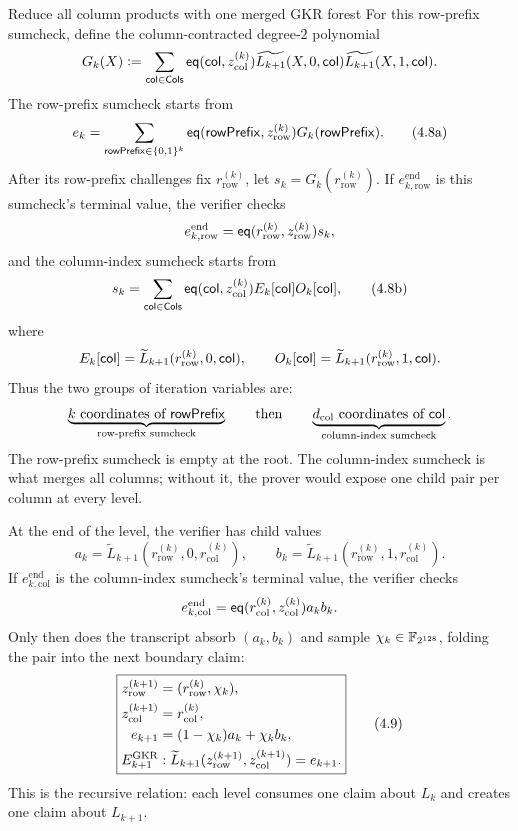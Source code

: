 \begin{step}{Reduce all column products with one merged GKR forest}{%
}
For this row-prefix sumcheck, define the
column-contracted degree-$2$ polynomial
\[
  G_k(X)
  \vcentcolon=
  \sum_{\mathsf{col}\in\mathsf{Cols}}
    \mathsf{eq}(\mathsf{col},z_{\mathrm{col}}^{(k)})
    \widetilde{L_{k+1}}(X,0,\mathsf{col})
    \widetilde{L_{k+1}}(X,1,\mathsf{col}).
\]
The row-prefix sumcheck starts from
\[
  e_k=\sum_{\mathsf{rowPrefix}\in\{0,1\}^k}
       \mathsf{eq}(\mathsf{rowPrefix},z_{\mathrm{row}}^{(k)})G_k(\mathsf{rowPrefix}).
                                                        \tag{4.8a}
\]
After its row-prefix challenges fix
$r_{\mathrm{row}}^{(k)}$, let
$s_k=G_k(r_{\mathrm{row}}^{(k)})$.  If
$e_{k,\mathrm{row}}^{\mathrm{end}}$ is this sumcheck's terminal value, the
verifier checks
\[
  e_{k,\mathrm{row}}^{\mathrm{end}}
  =\mathsf{eq}(r_{\mathrm{row}}^{(k)},z_{\mathrm{row}}^{(k)})s_k,
\]
and the column-index sumcheck starts from
\[
  s_k=\sum_{\mathsf{col}\in\mathsf{Cols}}
       \mathsf{eq}(\mathsf{col},z_{\mathrm{col}}^{(k)})
       E_k[\mathsf{col}]O_k[\mathsf{col}],                       \tag{4.8b}
\]
where
\[
  E_k[\mathsf{col}]
   =\widetilde L_{k+1}(r_{\mathrm{row}}^{(k)},0,\mathsf{col}),
  \qquad
  O_k[\mathsf{col}]
   =\widetilde L_{k+1}(r_{\mathrm{row}}^{(k)},1,\mathsf{col}).
\]
Thus the two groups of iteration variables are:
\[
  \underbrace{k\text{ coordinates of }\mathsf{rowPrefix}}_{\text{row-prefix sumcheck}}
  \qquad\text{then}\qquad
  \underbrace{d_{\mathrm{col}}\text{ coordinates of }\mathsf{col}}_{\text{column-index sumcheck}}.
\]
The row-prefix sumcheck is empty at the root.  The column-index sumcheck is what
merges all columns; without it, the prover would expose one child pair per
column at every level.

At the end of the level, the verifier has child values
\[
  a_k=\widetilde L_{k+1}(r_{\mathrm{row}}^{(k)},0,
                         r_{\mathrm{col}}^{(k)}),
  \qquad
  b_k=\widetilde L_{k+1}(r_{\mathrm{row}}^{(k)},1,
                         r_{\mathrm{col}}^{(k)}).
\]
If $e_{k,\mathrm{col}}^{\mathrm{end}}$ is the column-index sumcheck's terminal
value, the verifier checks
\[
  e_{k,\mathrm{col}}^{\mathrm{end}}
  =\mathsf{eq}(r_{\mathrm{col}}^{(k)},z_{\mathrm{col}}^{(k)})a_kb_k.
\]
Only then does the transcript absorb $(a_k,b_k)$ and sample
$\chi_k\in\mathbb{F}_{2^{128}}$, folding the pair into the next boundary claim:
\[
  \boxed{
  \begin{aligned}
  z_{\mathrm{row}}^{(k+1)}&=(r_{\mathrm{row}}^{(k)},\chi_k),\\
  z_{\mathrm{col}}^{(k+1)}&=r_{\mathrm{col}}^{(k)},\\
  e_{k+1}&=(1-\chi_k)a_k+\chi_k b_k,\\
  E_{k+1}^{\mathrm{GKR}}&:
    \widetilde L_{k+1}(z_{\mathrm{row}}^{(k+1)},z_{\mathrm{col}}^{(k+1)})=e_{k+1}.
  \end{aligned}}                                      \tag{4.9}
\]
This is the recursive relation: each level consumes one claim about $L_k$ and
creates one claim about $L_{k+1}$.


\end{step}
